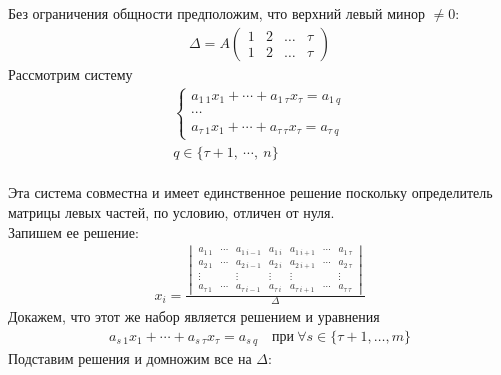		Без ограничения общности предположим, что верхний левый минор $\ne 0$:\\
		\begin{gather*}
		\Delta=A
			\begin{pmatrix}
				{1} & {2} & {\dots} & {\tau}\\
				{1} & {2} & {\dots} & {\tau}
			\end{pmatrix}
		\end{gather*}
		Рассмотрим систему\\
		\begin{gather*}
			\begin{cases} 
				a_{1\ 1} x_{1}+\cdots+a_{1\  \tau} x_{\tau} = a_{1\  q} \\
				\cdots \\
				a_{\tau\  1} x_{1}+\cdots+a_{\tau\  \tau} x_{\tau} = a_{\tau\  q}
			\end{cases}
			\\
			q \in \{ \tau + 1,\ \cdots,\ n \}
		\end{gather*}
		\\
		Эта система совместна и имеет единственное решение поскольку определитель матрицы левых частей, по условию, отличен от нуля.\\
		Запишем ее решение:\\
		\begin{gather*}
			x_i = 
			\frac{
			\begin{vmatrix}
				a_{1\ 1} & \cdots & a_{1\ i-1} & a_{1\ i} & a_{1\ i+1} & \cdots & a_{1\ \tau}\\
				a_{2\ 1} & \cdots & a_{2\ i-1} & a_{2\ i} & a_{2\ i+1} & \cdots & a_{2\ \tau}\\
				\vdots & & \vdots & \vdots & \vdots &  & \vdots\\
				a_{\tau\ 1} & \cdots & a_{\tau\ i-1} & a_{\tau\ i} & a_{\tau\ i+1} & \cdots & a_{\tau\ \tau}
			\end{vmatrix}
			}{\Delta}
		\end{gather*}
		Докажем, что этот же набор является решением и уравнения\\
		\begin{gather*}
			a_{s\  1} x_{1}+\cdots+a_{s\ \tau} x_{\tau}=a_{s\  q} \quad \text{при} \ \forall s \in\{\tau+1, \ldots, m\}
		\end{gather*}
		Подставим решения и домножим все на $\Delta$:
